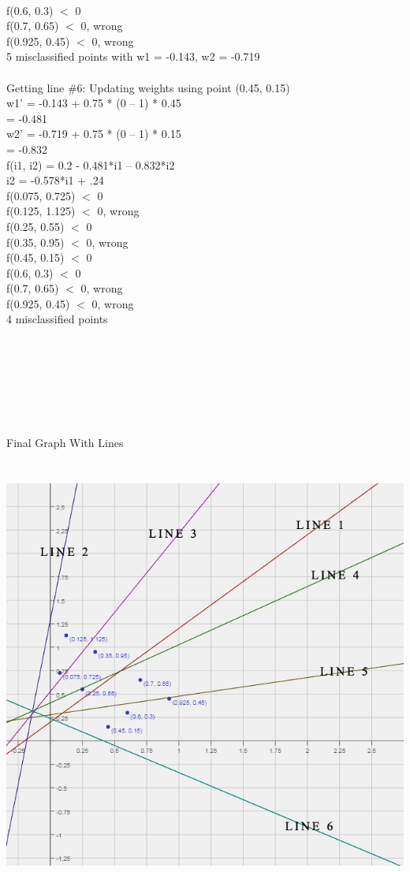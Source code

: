 \documentclass{article}
\begin{document}
\\
f(0.6, 0.3) $<$ 0
\\
f(0.7, 0.65) $<$ 0, wrong
\\
f(0.925, 0.45) $<$ 0, wrong
\\
5 misclassified points with w1 = -0.143, w2 = -0.719
\\
\\
{\LARGE Getting line \#6:}
Updating weights using point (0.45, 0.15)
\\
w1’ = -0.143 + 0.75 * (0 – 1) * 0.45
\\
	= -0.481
\\
w2’ = -0.719 + 0.75 * (0 – 1) * 0.15
\\
	= -0.832
\\
f(i1, i2) = 0.2 - 0.481*i1 – 0.832*i2
\\
i2 = -0.578*i1 + .24
\\
f(0.075, 0.725) $<$ 0
\\
f(0.125, 1.125) $<$ 0, wrong
\\
f(0.25, 0.55) $<$ 0
\\
f(0.35, 0.95) $<$ 0, wrong
\\
f(0.45, 0.15) $<$ 0
\\
f(0.6, 0.3) $<$ 0
\\
f(0.7, 0.65) $<$ 0, wrong
\\
f(0.925, 0.45) $<$ 0, wrong
\\
4 misclassified points
\\
\\
\\
\\
\\
\\
\\
\\
{\LARGE Final Graph With Lines}
\\
\includegraphics[width=15cm,height=15cm,keepaspectratio]{"graph"}
\end{document}
